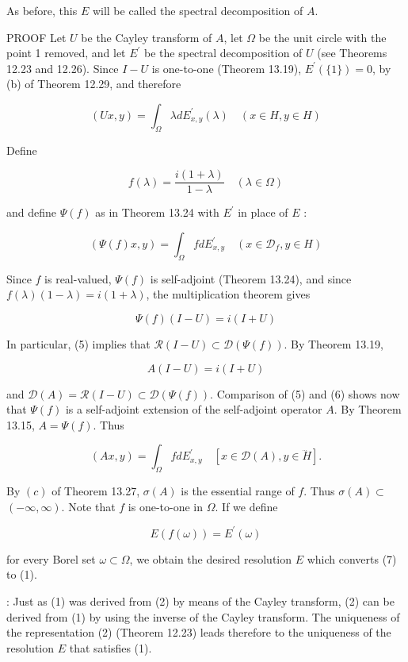 \documentclass[10pt]{article}
\begin{document}
As before, this $E$ will be called the spectral decomposition of $A$.

PROOF Let $U$ be the Cayley transform of $A$, let $\Omega$ be the unit circle with the point 1 removed, and let $E^{\prime}$ be the spectral decomposition of $U$ (see Theorems 12.23 and 12.26). Since $I-U$ is one-to-one (Theorem 13.19), $E^{\prime}(\{1\})=0$, by (b) of Theorem 12.29, and therefore

$$
(U x, y)=\int_{\Omega} \lambda d E_{x, y}^{\prime}(\lambda) \quad(x \in H, y \in H)
$$

Define

$$
f(\lambda)=\frac{i(1+\lambda)}{1-\lambda} \quad(\lambda \in \Omega)
$$

and define $\Psi(f)$ as in Theorem 13.24 with $E^{\prime}$ in place of $E$ :

$$
(\Psi(f) x, y)=\int_{\Omega} f d E_{x, y}^{\prime} \quad\left(x \in \mathscr{D}_{f}, y \in H\right)
$$

Since $f$ is real-valued, $\Psi(f)$ is self-adjoint (Theorem 13.24), and since $f(\lambda)(1-\lambda)=i(1+\lambda)$, the multiplication theorem gives

$$
\Psi(f)(I-U)=i(I+U)
$$

In particular, (5) implies that $\mathscr{R}(I-U) \subset \mathscr{D}(\Psi(f))$. By Theorem 13.19,

$$
A(I-U)=i(I+U)
$$

and $\mathscr{D}(A)=\mathscr{R}(I-U) \subset \mathscr{D}(\Psi(f))$. Comparison of (5) and (6) shows now that $\Psi(f)$ is a self-adjoint extension of the self-adjoint operator $A$. By Theorem 13.15, $A=\Psi(f)$. Thus

$$
(A x, y)=\int_{\Omega} f d E_{x, y}^{\prime} \quad[x \in \mathscr{D}(A), y \in \dddot{H}] .
$$

By $(c)$ of Theorem 13.27, $\sigma(A)$ is the essential range of $f$. Thus $\sigma(A) \subset$ $(-\infty, \infty)$. Note that $f$ is one-to-one in $\Omega$. If we define

$$
E(f(\omega))=E^{\prime}(\omega)
$$

for every Borel set $\omega \subset \Omega$, we obtain the desired resolution $E$ which converts (7) to (1).

: Just as (1) was derived from (2) by means of the Cayley transform, (2) can be derived from (1) by using the inverse of the Cayley transform. The uniqueness of the representation (2) (Theorem 12.23) leads therefore to the uniqueness of the resolution $E$ that satisfies (1).
\end{document}
